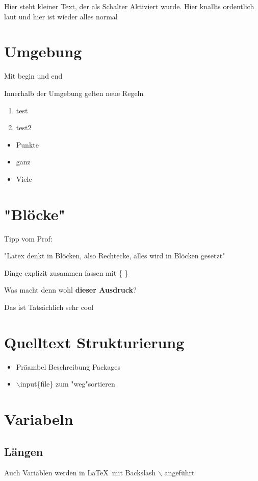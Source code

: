 \tiny
Hier steht kleiner Text, der als Schalter Aktiviert wurde.
\Huge
Hier knallts ordentlich laut
\normalsize
und hier ist wieder alles normal

\section{Umgebung}

Mit begin und end

Innerhalb der Umgebung gelten neue Regeln
\begin{enumerate}
	\item
	test
	\item
	test2
\end{enumerate}

\begin{itemize}
	\item Punkte
	\item ganz
	\item Viele
\end{itemize}

\section{"Blöcke"}
Tipp vom Prof:

"Latex denkt in Blöcken, also Rechtecke, alles wird in Blöcken gesetzt"

Dinge explizit zusammen fassen mit \{ \}

Was macht denn wohl {\bf dieser Ausdruck}?

Das ist Tatsächlich sehr cool

\section{Quelltext Strukturierung}
\begin{itemize}
	\item Präambel
	\subitem Beschreibung
	\subitem Packages
	\item $\backslash$input\{file\} zum "weg"sortieren
\end{itemize}

\section{Variabeln}
\subsection{Längen}
Auch Variablen werden in \LaTeX \ mit  Backslash $\backslash$ angeführt

